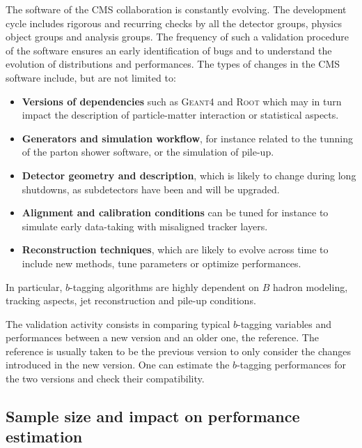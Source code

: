     The software of the CMS collaboration is constantly evolving. The development cycle
    includes rigorous and recurring checks by all the detector groups, physics
    object groups and analysis groups. The frequency of such a validation procedure
    of the software ensures an early identification of bugs and to understand
    the evolution of distributions and performances. The types of changes in the CMS
    software include, but are not limited to:
    \begin{itemize}
        \item \textbf{Versions of dependencies} such as \textsc{Geant4} and
              \textsc{Root} which may in turn impact the description of particle-matter
              interaction or statistical aspects.
        \item \textbf{Generators and simulation workflow}, for instance related to
              the tunning of the parton shower software, or the simulation of pile-up.
        \item \textbf{Detector geometry and description}, which is likely to change during
              long shutdowns, as subdetectors have been and will be upgraded.
        \item \textbf{Alignment and calibration conditions} can be tuned for instance to
              simulate early data-taking with misaligned tracker layers.
        \item \textbf{Reconstruction techniques}, which are likely to evolve across time to include
              new methods, tune parameters or optimize performances.
    \end{itemize}

    In particular, $b$-tagging algorithms are highly dependent on $B$ hadron modeling, tracking
    aspects, jet reconstruction and pile-up conditions.

    The validation activity consists in comparing typical $b$-tagging variables and performances
    between a new version and an older one, the reference. The reference is usually taken to
    be the previous version to only consider the changes introduced in the new version.
    One can estimate the $b$-tagging performances for the two versions and check their
    compatibility.

    \subsection{Sample size and impact on performance estimation}

